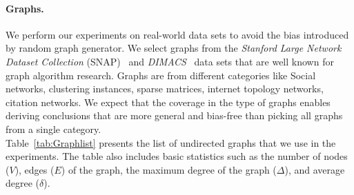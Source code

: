 \documentclass[default,iicol]{sn-jnl}%
\theoremstyle{thmstyleone}%
\theoremstyle{thmstyletwo}%
\theoremstyle{thmstylethree}%
\begin{document}
\paragraph{Graphs.}
We perform our experiments on real-world data sets to avoid the
bias introduced by random graph generator.
We select graphs from the \textit{Stanford Large Network Dataset Collection} 
(SNAP)~\cite{snapnets} and \textit{DIMACS}~\cite{sanders2014benchmarking,bader2013graph} data sets that are well known 
for graph algorithm research. Graphs are from different categories like Social networks, clustering instances, sparse matrices, 
internet topology networks, citation networks. We expect that the coverage in the type of graphs 
enables deriving conclusions that are more general and bias-free than picking all graphs from a single category. 
\\
Table~\ref{tab:Graphlist}  presents the list of undirected graphs that we use in the experiments. The table also includes 
basic statistics such as the number of nodes ($V$), edges ($E$) of the graph, the maximum degree of the graph ($\Delta$), 
and average degree ($\delta$).
\\
\end{document}
